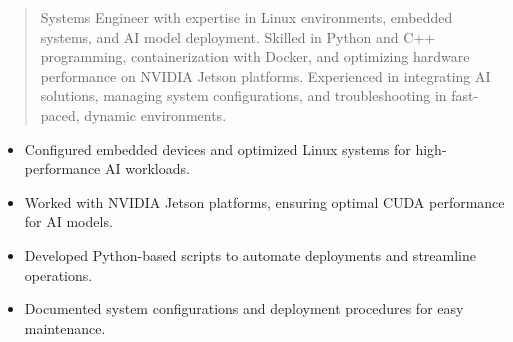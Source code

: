 



\makecvheader

\begin{quote}
  \noindent
  Systems Engineer with expertise in Linux environments, embedded systems, and AI model deployment. Skilled in Python and C++ programming, containerization with Docker, and optimizing hardware performance on NVIDIA Jetson platforms. Experienced in integrating AI solutions, managing system configurations, and troubleshooting in fast-paced, dynamic environments.
\end{quote}

\par\smallskip
\noindent
\begin{minipage}{20cm}
  \begin{minipage}{9.75cm}
    \begin{itemize}
      \item Configured embedded devices and optimized Linux systems for high-performance AI workloads.
      \item Worked with NVIDIA Jetson platforms, ensuring optimal CUDA performance for AI models.
    \end{itemize}
  \end{minipage}
  \hfill
  \begin{minipage}{9.75cm}
    \begin{itemize}
      \item Developed Python-based scripts to automate deployments and streamline operations.
      \item Documented system configurations and deployment procedures for easy maintenance.
    \end{itemize}
  \end{minipage}
\end{minipage}
\par\smallskip
\divider

